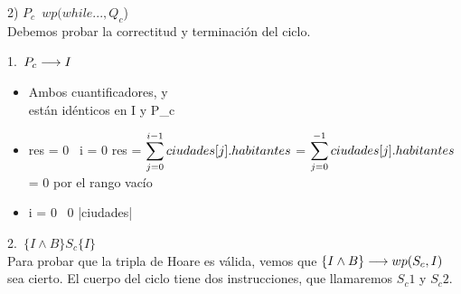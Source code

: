 \documentclass[10pt,a4paper,fleqn]{article}
\begin{document}
\item 2) $P_c$\implica \ $wp(while...,Q_c$)\\
Debemos probar la correctitud y terminación del ciclo.
\item 1.\ $P_c\longrightarrow I$ \\

\begin{itemize}
    \item \parbox[t]{\textwidth}{ Ambos cuantificadores,  y \\ están idénticos en I y P_c} 
    \item \parbox[t]{\textwidth}{res = 0 \land \ i = 0 \implica res = $\small \displaystyle \sum_{j=0}^{i-1} ciudades[j].habitantes$ = $\small \displaystyle \sum_{j=0}^{-1} ciudades[j].habitantes$ = 0 por el rango vacío }
     \item \parbox[t]{\textwidth}{i = 0 \implica \ 0  \leq |ciudades|}
\end{itemize}
\item 2.\ $\{I \land B\}S_c\{I\}$  \\Para probar que la tripla de Hoare es válida, vemos que $\{I \land B\} \longrightarrow wp(S_c,I)$ sea cierto.
El cuerpo del ciclo tiene dos instrucciones, que llamaremos $S_c1$ y $S_c2$. 
\end{document}
